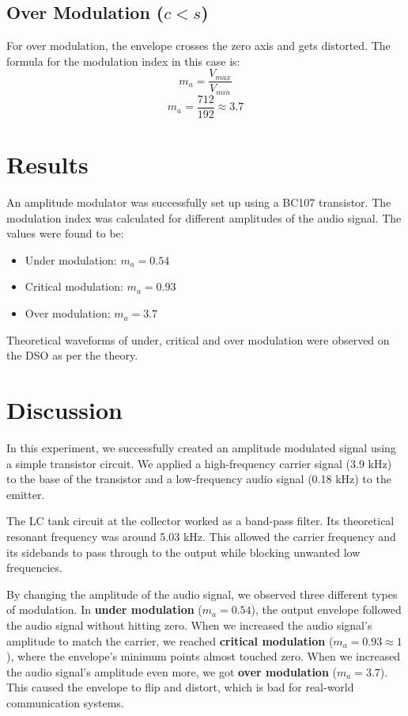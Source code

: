\documentclass[12pt,a4paper]{article}
\begin{document}
\subsection{Over Modulation ($c < s$)}
For over modulation, the envelope crosses the zero axis and gets distorted. The formula for the modulation index in this case is:
$$m_a = \frac{V_{max}}{V_{min}}$$
$$m_a = \frac{712}{192} \approx 3.7$$

\section{Results}
An amplitude modulator was successfully set up using a BC107 transistor. The modulation index was calculated for different amplitudes of the audio signal. The values were found to be:
\begin{itemize}
    \item Under modulation: $m_a = 0.54$
    \item Critical modulation: $m_a = 0.93$
    \item Over modulation: $m_a = 3.7$
\end{itemize}

Theoretical waveforms of under, critical and over modulation were observed on the DSO as per the theory.


\section{Discussion}
In this experiment, we successfully created an amplitude modulated signal using a simple transistor circuit. We applied a high-frequency carrier signal (3.9 kHz) to the base of the transistor and a low-frequency audio signal (0.18 kHz) to the emitter.

The LC tank circuit at the collector worked as a band-pass filter. Its theoretical resonant frequency was around 5.03 kHz. This allowed the carrier frequency and its sidebands to pass through to the output while blocking unwanted low frequencies.

By changing the amplitude of the audio signal, we observed three different types of modulation. In \textbf{under modulation} ($m_a = 0.54$), the output envelope followed the audio signal without hitting zero. When we increased the audio signal's amplitude to match the carrier, we reached \textbf{critical modulation} ($m_a = 0.93 \approx 1$), where the envelope's minimum points almost touched zero. When we increased the audio signal's amplitude even more, we got \textbf{over modulation} ($m_a = 3.7$). This caused the envelope to flip and distort, which is bad for real-world communication systems.
\end{document}
